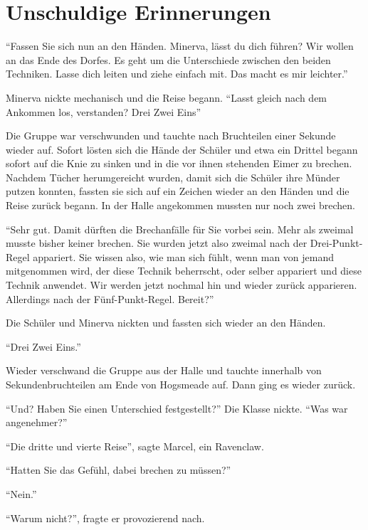 \chapter{Unschuldige Erinnerungen}


\enquote{Fassen Sie sich nun an den Händen. Minerva, lässt du dich führen? Wir wollen an das Ende des Dorfes. Es geht um die Unterschiede zwischen den beiden Techniken. Lasse dich leiten und ziehe einfach mit. Das macht es mir leichter.}

Minerva nickte mechanisch und die Reise begann. \enquote{Lasst gleich nach dem Ankommen los, verstanden? \gst Drei \gst Zwei \gst Eins\abs}

 Die Gruppe war verschwunden und tauchte nach Bruchteilen einer Sekunde wieder auf. Sofort lösten sich die Hände der Schüler und etwa ein Drittel begann sofort auf die Knie zu sinken und in die vor ihnen stehenden Eimer zu brechen. Nachdem Tücher herumgereicht wurden, damit sich die Schüler ihre Münder putzen konnten, fassten sie sich auf ein Zeichen wieder an den Händen und die Reise zurück begann. In der Halle angekommen mussten nur noch zwei brechen.

\enquote{Sehr gut. Damit dürften die Brechanfälle für Sie vorbei sein. Mehr als zweimal musste bisher keiner brechen. \gst Sie wurden jetzt also zweimal nach der Drei-Punkt-Regel appariert. Sie wissen also, wie man sich fühlt, wenn man von jemand mitgenommen wird, der diese Technik beherrscht, oder selber appariert und diese Technik anwendet. Wir werden jetzt nochmal hin und wieder zurück apparieren. Allerdings nach der Fünf-Punkt-Regel. \gst Bereit?}

Die Schüler und Minerva nickten und fassten sich wieder an den Händen.

\enquote{Drei \gst Zwei \gst Eins.}

 Wieder verschwand die Gruppe aus der Halle und tauchte innerhalb von Sekundenbruchteilen am Ende von Hogsmeade auf. Dann ging es wieder zurück.

\enquote{Und? Haben Sie einen Unterschied festgestellt?} Die Klasse nickte. \enquote{Was war angenehmer?}

\enquote{Die dritte und vierte Reise}, sagte Marcel, ein Ravenclaw.

\enquote{Hatten Sie das Gefühl, dabei brechen zu müssen?}

\enquote{Nein.}

\enquote{Warum nicht?}, fragte er provozierend nach.

